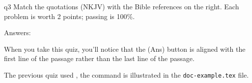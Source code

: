 \documentclass{article}
\begin{document}
\begin{quiz*}{q3}
Match the quotations (\textsf{NKJV)} with the Bible references on the right.
Each problem is worth 2 points; passing is 100\%.

\useMCCircles

\noindent
\begin{minipage}[t]{.75\linewidth-\eflength}
\useNumbersOff
\priorRBT{\makebox[0pt][l]{\hspace{\RBTWidth}\hspace{\labelsep}\hspace{\linewidth}\enspace#1\enspace}}
\adjCAB{}
\begin{questions}
\begin{BblPsg}
  \item{}
  \item{}
  \item{}
\end{BblPsg}

\end{questions}
\end{minipage}%
\hfill
\begin{minipage}[t]{.25\linewidth} %
\begin{questions}[itemsep={0pt},labelwidth={1em}]
 \begin{BblVrs}
  \item{}
  \item{}
  \item{}
  \item{}
  \item{}
  \item{}
\end{BblVrs}
\end{questions}
\end{minipage}\hfil
\par\medskip
\end{quiz*}\quad\PointsField\currQuiz\olBdry\CorrButton\currQuiz\cgBdry[6pt]
Answers: \vcgBdry[6pt]

When you take this quiz, you'll notice that the 
(\textsf{Ans}) button is aligned with the first line of the passage rather
than the last line of the passage.

The previous quiz used , the command  is
illustrated in the \texttt{doc-example.tex} file.
\end{document}
